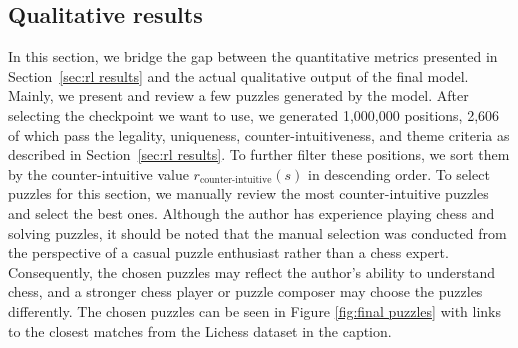 




\subsection{Qualitative results}
\label{sec:qualitative results}

In this section, we bridge the gap between the quantitative metrics presented in Section~\ref{sec:rl results} and the actual qualitative output of the final model. Mainly, we present and review a few puzzles generated by the model. After selecting the checkpoint we want to use, we generated 1,000,000 positions, 2,606 of which pass the legality, uniqueness, counter-intuitiveness, and theme criteria as described in Section~\ref{sec:rl results}. To further filter these positions, we sort them by the counter-intuitive value $r_{\text{counter-intuitive}}(s)$ in descending order. To select puzzles for this section, we manually review the most counter-intuitive puzzles and select the best ones. Although the author has experience playing chess and solving puzzles, it should be noted that the manual selection was conducted from the perspective of a casual puzzle enthusiast rather than a chess expert. Consequently, the chosen puzzles may reflect the author's ability to understand chess, and a stronger chess player or puzzle composer may choose the puzzles differently. The chosen puzzles can be seen in Figure \ref{fig:final puzzles} with links to the closest matches from the Lichess dataset in the caption.


